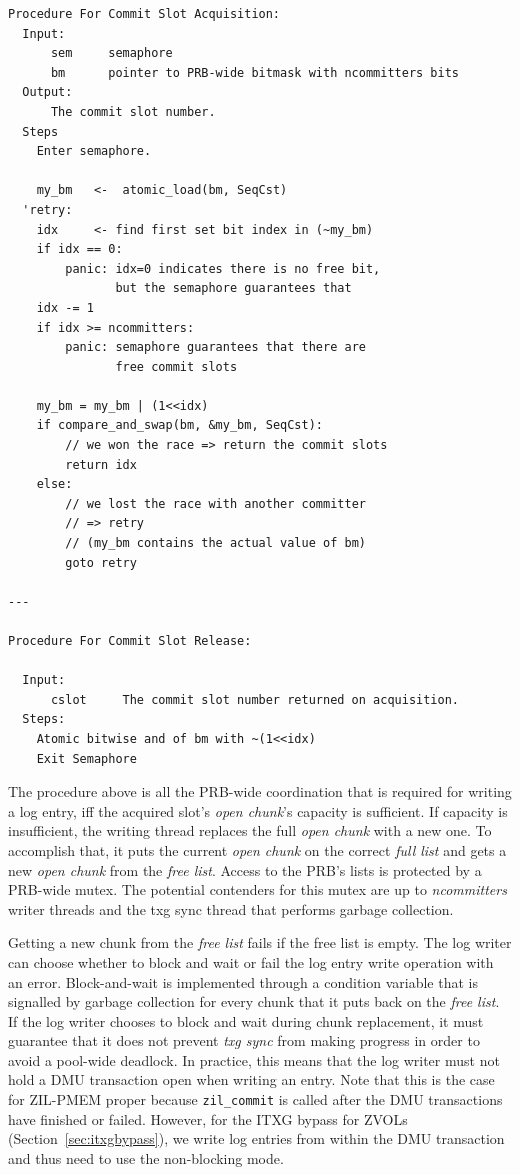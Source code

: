 \documentclass[12pt,a4paper,twoside]{book}
\begin{document}
\begin{lstlisting}[style=figurepseudocode]
Procedure For Commit Slot Acquisition:
  Input:
      sem     semaphore
      bm      pointer to PRB-wide bitmask with ncommitters bits
  Output:
      The commit slot number.
  Steps
    Enter semaphore.

    my_bm   <-  atomic_load(bm, SeqCst)
  'retry:
    idx     <- find first set bit index in (~my_bm)
    if idx == 0:
        panic: idx=0 indicates there is no free bit,
               but the semaphore guarantees that
    idx -= 1
    if idx >= ncommitters:
        panic: semaphore guarantees that there are
               free commit slots

    my_bm = my_bm | (1<<idx)
    if compare_and_swap(bm, &my_bm, SeqCst):
        // we won the race => return the commit slots
        return idx
    else:
        // we lost the race with another committer
        // => retry
        // (my_bm contains the actual value of bm)
        goto retry

---

Procedure For Commit Slot Release:

  Input:
      cslot     The commit slot number returned on acquisition.
  Steps:
    Atomic bitwise and of bm with ~(1<<idx)
    Exit Semaphore
\end{lstlisting}

The procedure above is all the PRB-wide coordination that is required for writing a log entry, iff the acquired slot's \textit{open chunk}'s capacity is sufficient.
If capacity is insufficient, the writing thread replaces the full \textit{open chunk} with a new one.
To accomplish that, it puts the current \textit{open chunk} on the correct \textit{full list} and gets a new \textit{open chunk} from the \textit{free list}.
Access to the PRB's lists is protected by a PRB-wide mutex.
The potential contenders for this mutex are up to \textit{ncommitters} writer threads and the txg sync thread that performs garbage collection.

Getting a new chunk from the \textit{free list} fails if the free list is empty.
The log writer can choose whether to block and wait or fail the log entry write operation with an error.
Block-and-wait is implemented through a condition variable that is signalled by garbage collection for every chunk that it puts back on the \textit{free list}.
If the log writer chooses to block and wait during chunk replacement, it must guarantee that it does not prevent \textit{txg sync} from making progress in order to avoid a pool-wide deadlock.
In practice, this means that the log writer must not hold a DMU transaction open when writing an entry.
Note that this is the case for ZIL-PMEM proper because \lstinline{zil_commit} is called after the DMU transactions have finished or failed.
However, for the ITXG bypass for ZVOLs (Section~\ref{sec:itxgbypass}), we write log entries from within the DMU transaction and thus need to use the non-blocking mode.
\end{document}

